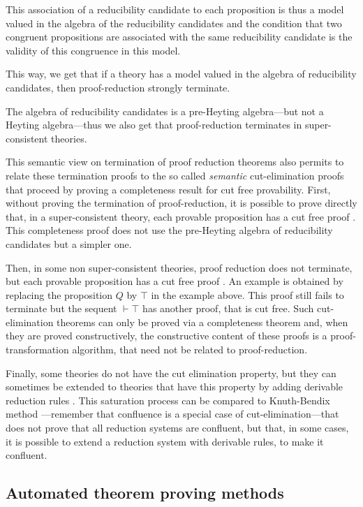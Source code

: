 \documentclass{llncs}
\begin{document}
This association of a reducibility candidate to each proposition is
thus a model valued in the algebra of the reducibility candidates and
the condition that two congruent propositions are associated with the
same reducibility candidate is the validity of this congruence in this
model.

This way, we get that if a theory has a model valued in the algebra of
reducibility candidates, then proof-reduction strongly terminate.

The algebra of reducibility candidates is a pre-Heyting algebra---but
not a Heyting algebra---thus we also get that proof-reduction
terminates in super-consistent theories.

This semantic view on termination of proof reduction theorems also
permits to relate these termination proofs to the so called {\em
  semantic} cut-elimination proofs that proceed by proving a
completeness result for cut free provability.  First, without proving
the termination of proof-reduction, it is possible to prove directly
that, in a super-consistent theory, each provable proposition has a
cut free proof \cite{DowekHermant,BHH}.  This completeness proof does not
use the pre-Heyting algebra of reducibility candidates but a simpler
one.

Then, in some non super-consistent theories, proof reduction does not
terminate, but each provable proposition has a cut free proof
\cite{Hermant05}. An example is obtained by replacing the proposition
$Q$ by $\top$ in the example above.  This proof still fails to
terminate but the sequent $\vdash \top$ has another proof, that is cut
free. Such cut-elimination theorems can only be proved via a
completeness theorem and, when they are proved constructively, the
constructive content of these proofs is a proof-transformation
algorithm, that need not be related to proof-reduction.

Finally, some theories do not have the cut elimination property, but
they can sometimes be extended to theories that have this property by adding
derivable reduction rules \cite{BurelKirchner,Burel14}. 
This saturation process can be
compared to Knuth-Bendix method \cite{KB}---remember that confluence
is a special case of cut-elimination---that does not prove that all reduction
systems are confluent, but that, in some cases, it is possible to
extend a reduction system with derivable rules, to make it confluent.

\subsection{Automated theorem proving methods}
\end{document}
